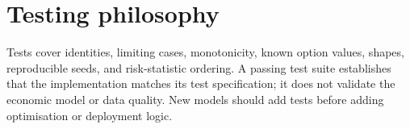 \section{Testing philosophy}
Tests cover identities, limiting cases, monotonicity, known option values, shapes, reproducible seeds, and risk-statistic ordering. A passing test suite establishes that the implementation matches its test specification; it does not validate the economic model or data quality. New models should add tests before adding optimisation or deployment logic.

